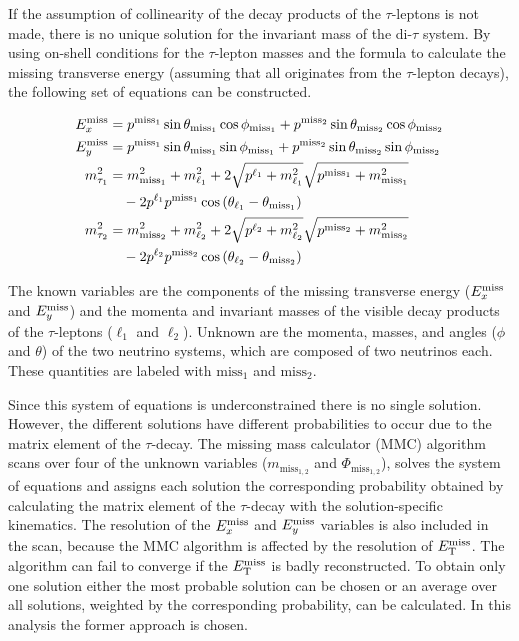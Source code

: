 If the assumption of collinearity of the decay products of the $\tau$-leptons is not made, there
is no unique solution for the invariant mass of the di-$\tau$ system.
By using on-shell conditions for the $\tau$-lepton masses and the formula to calculate the
missing transverse energy (assuming that all \etmiss{} originates from the $ \tau$-lepton decays),
the following set of equations can be constructed.

\begin{equation}
    \label{eq:mmc:equations}
    \begin{aligned}
        E_x^\text{miss} &= p^{\text{miss}_1} \sin \theta_{\text{miss}_1} \cos \phi_{\text{miss}_1} + p^{\text{miss}_2} \sin \theta_{\text{miss}_2} \cos \phi_{\text{miss}_2} \\
        E_y^\text{miss} &= p^{\text{miss}_1} \sin \theta_{\text{miss}_1} \sin \phi_{\text{miss}_1} + p^{\text{miss}_2} \sin \theta_{\text{miss}_2} \sin \phi_{\text{miss}_2} \\
        m_{\tau_1}^2 &= m_{\text{miss}_1}^2 + m_{\ell_1}^2 + 2 \sqrt{p^{\ell_1} + m_{\ell_1}^2} \sqrt{p^{\text{miss}_1} + m_{\text{miss}_1}^2} \\ 
                     & \quad - 2 p^{\ell_1} p^{\text{miss}_1} \cos{(\theta_{\ell_1} - \theta_{\text{miss}_1})} \\
        m_{\tau_2}^2 &= m_{\text{miss}_2}^2 + m_{\ell_2}^2 + 2 \sqrt{p^{\ell_2} + m_{\ell_2}^2} \sqrt{p^{\text{miss}_2} + m_{\text{miss}_2}^2}\\
                     & \quad - 2 p^{\ell_2} p^{\text{miss}_2} \cos{(\theta_{\ell_2} - \theta_{\text{miss}_2})}
    \end{aligned}
\end{equation}

The known variables are the components of the missing transverse energy ($E_x^\text{miss}$ and $E_y^\text{miss}$)
and the momenta and invariant masses of the visible decay products of the $\tau$-leptons ($\ell_1$ and $\ell_2$).
Unknown are the momenta, masses, and angles ($\phi$ and $\theta$) of the two neutrino systems, which are composed of two neutrinos each.
These quantities are labeled with $\text{miss}_1$ and $\text{miss}_2$.

Since this system of equations is underconstrained there is no single solution.
However, the different solutions have different probabilities to occur due to the matrix element of the $\tau$-decay.
The missing mass calculator (MMC) algorithm~\cite{MMC} scans over four of the unknown variables ($m_{\text{miss}_{1,2}}$ and $\Phi_{\text{miss}_{1,2}}$),
solves the system of equations and assigns each solution the corresponding probability obtained by calculating the matrix
element of the $\tau$-decay with the solution-specific kinematics.
The resolution of the $E_x^\text{miss}$ and $E_y^\text{miss}$ variables is also included in the scan, because the MMC algorithm
is affected by the resolution of $E_\text{T}^\text{miss}$.
The algorithm can fail to converge if the $E_\text{T}^\text{miss}$ is badly reconstructed.
To obtain only one solution either the most probable solution can be chosen or an average over all solutions,
weighted by the corresponding probability, can be calculated.
In this analysis the former approach is chosen.


